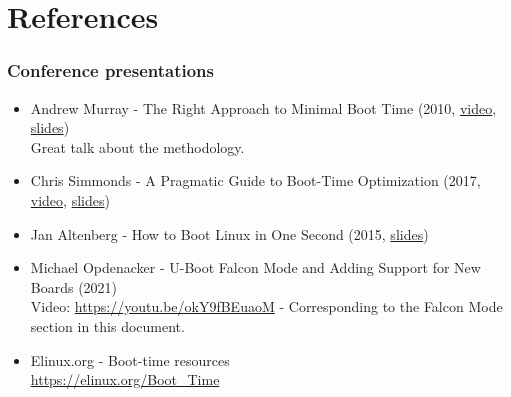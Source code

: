 \section{References}

\begin{frame}
\frametitle{Conference presentations}
\small
\begin{itemize}
\item Andrew Murray - The Right Approach to Minimal Boot Time (2010,
      \href{https://bootlin.com/pub/video/2010/elce/elce2010-murray-boot-time.webm}{video},
      \href{https://elinux.org/images/f/f7/RightApproachMinimalBootTimes.pdf}{slides}) \\
      Great talk about the methodology.
\item Chris Simmonds - A Pragmatic Guide to Boot-Time Optimization (2017,
      \href{https://youtu.be/gIK1he6Ocpg}{video},
      \href{https://elinux.org/images/6/64/Chris-simmonds-boot-time-elce-2017_0.pdf}{slides})
\item Jan Altenberg - How to Boot Linux in One Second (2015,
      \href{https://www.elinux.org/images/9/97/Boot_one_second_altenberg.pdf}{slides})
\item Michael Opdenacker - U-Boot Falcon Mode and Adding Support for New Boards (2021)\\
      Video: \url{https://youtu.be/okY9fBEuaoM} - Corresponding to the Falcon Mode section in this document.
\item Elinux.org - Boot-time resources\\
      \url{https://elinux.org/Boot_Time}
\end{itemize}
\end{frame}
